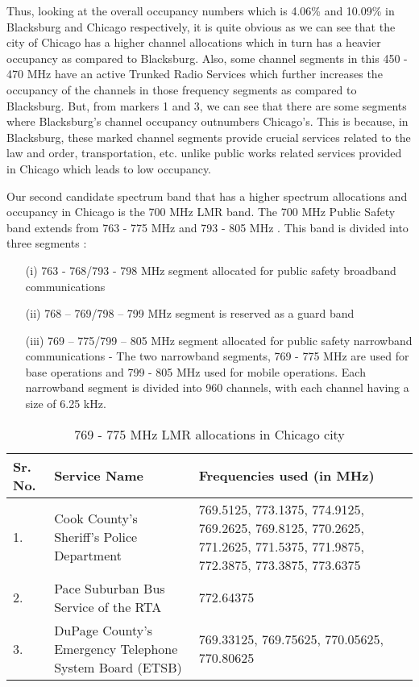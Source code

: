\documentclass[12pt,sts]{report}
\begin{document}
	Thus, looking at the overall occupancy numbers which is 4.06\% and 10.09\% in Blacksburg and Chicago respectively, it is quite obvious as we can see that the city of Chicago has a higher channel allocations \cite{chicago_spec_occ} which in turn has a heavier occupancy as compared to Blacksburg. Also, some channel segments in this 450 - 470 MHz have an active Trunked Radio Services which further increases the occupancy of the channels in those frequency segments as compared to Blacksburg. But, from markers 1 and 3, we can see that there are some segments where Blacksburg's channel occupancy outnumbers Chicago's. This is because, in Blacksburg, these marked channel segments provide crucial services related to the law and order, transportation, etc. unlike public works related services provided in Chicago which leads to low occupancy.
	
	Our second candidate spectrum band that has a higher spectrum allocations and occupancy in Chicago is the 700 MHz LMR band. The 700 MHz Public Safety band extends from 763 - 775 MHz and 793 - 805 MHz \cite{fcc_700_MHz_lmr}. This band is divided into three segments \cite{fcc_700_MHz_lmr}:
	
	\begin{enumerate}
		\item[(i)] 763 - 768/793 - 798 MHz segment allocated for public safety broadband communications
		\item[(ii)] 768 – 769/798 – 799 MHz segment is reserved as a guard band
		\item[(iii)] 769 – 775/799 – 805 MHz segment allocated for public safety narrowband communications - The two narrowband segments, 769 - 775 MHz are used for base operations and 799 - 805 MHz used for mobile operations. Each narrowband segment is divided into 960 channels, with each channel having a size of 6.25 kHz.
	\end{enumerate}
	
	\begin{table}[ht!]
	\centering
		\begin{tabular}{| p{1cm} | p{6cm} | p{4cm} |}
		\hline
		Sr. No. & Service Name & Frequencies used (in MHz)	\\	\hline
		1. & Cook County's Sheriff's Police Department & 769.5125, 773.1375, 774.9125, 769.2625, 769.8125, 770.2625, 771.2625, 771.5375, 771.9875, 772.3875, 773.3875, 773.6375 \\ \hline
		2. & Pace Suburban Bus Service of the RTA & 772.64375	\\	\hline
		3. & DuPage County's Emergency Telephone System Board (ETSB) & 769.33125, 769.75625, 770.05625, 770.80625	\\
		\hline
		\end{tabular}
		\caption{769 - 775 MHz LMR allocations in Chicago city}
	\end{table}
	
\end{document}

